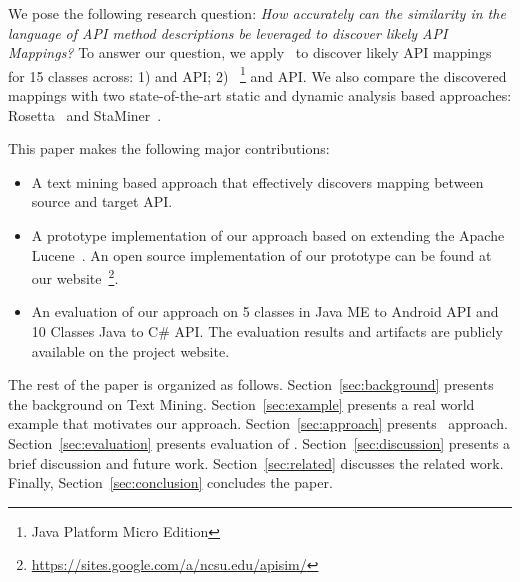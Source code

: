 We pose the following research question:
\textit{How accurately can the similarity in the language of API method descriptions
	be leveraged to discover likely API Mappings?}
To answer our question, we apply \tool\ to discover likely API mappings for 15 classes across:
1)  and  API; 2) ~\footnote{Java Platform Micro Edition} and  API.
We also compare the discovered mappings with two state-of-the-art static and dynamic analysis based approaches: Rosetta~\cite{Gokhale2013ICSE} and StaMiner~\cite{nguyen2014statistical}.


This paper makes the following major contributions:
\begin{itemize}
	\item A text mining based approach that effectively discovers mapping between source and target API.
	\item A prototype implementation of our approach based on extending the Apache Lucene~\cite{lucene}. An open source implementation of our prototype can be found at our website~\footnote{\url{https://sites.google.com/a/ncsu.edu/apisim/}}. 
	\item An evaluation of our approach on 5 classes in Java ME to Android API and 10 Classes Java to C\# API. The evaluation results and artifacts are publicly available on the project website.
\end{itemize}


The rest of the paper is organized as follows.
Section~\ref{sec:background} presents the background on Text Mining.
Section~\ref{sec:example} presents a real world example that motivates our approach. Section~\ref{sec:approach} presents \tool\ approach.
Section~\ref{sec:evaluation} presents evaluation of \tool.
Section~\ref{sec:discussion} presents a brief discussion and future work.
Section~\ref{sec:related} discusses the related work.
Finally, Section~\ref{sec:conclusion} concludes the paper.


